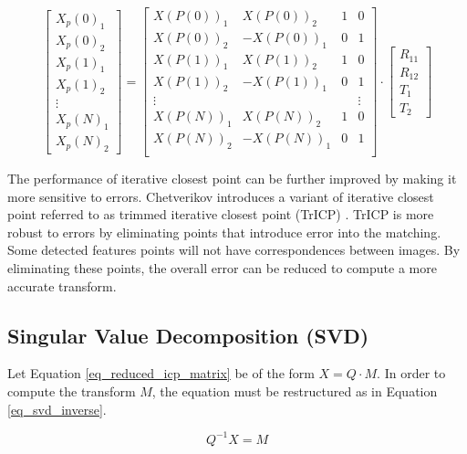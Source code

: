 \documentclass{article}
\begin{document}
\begin{equation}
\begin{bmatrix}
X_p(0)_1 \\
X_p(0)_2 \\
X_p(1)_1 \\
X_p(1)_2 \\
\vdots \\
X_p(N)_1 \\
X_p(N)_2
\end{bmatrix}
=
\begin{bmatrix}
X(P(0))_1 & X(P(0))_2 & 1 & 0 \\
X(P(0))_2 & -X(P(0))_1 & 0 & 1 \\
X(P(1))_1 & X(P(1))_2 & 1 & 0 \\
X(P(1))_2 & -X(P(1))_1 & 0 & 1 \\
\vdots & & & \vdots \\
X(P(N))_1 & X(P(N))_2 & 1 & 0 \\
X(P(N))_2 & -X(P(N))_1 & 0 & 1 \\
\end{bmatrix}
\cdot
\begin{bmatrix}
R_{11} \\
R_{12} \\
T_1 \\
T_2
\end{bmatrix}
\label{eq_reduced_icp_matrix}
\end{equation}

The performance of iterative closest point can be further improved by making it more sensitive to errors. Chetverikov introduces a variant of iterative closest point referred to as trimmed iterative closest point (TrICP) \cite{chetverikov_trimmed_2002}. TrICP is more robust to errors by eliminating points that introduce error into the matching. Some detected features points will not have correspondences between images. By eliminating these points, the overall error can be reduced to compute a more accurate transform.

\subsection{Singular Value Decomposition (SVD)}

Let Equation \ref{eq_reduced_icp_matrix} be of the form $X=Q \cdot M$. In order to compute the transform $M$, the equation must be restructured as in Equation \ref{eq_svd_inverse}.

\begin{equation}
Q^{-1} X = M
\label{eq_svd_inverse}
\end{equation}
\end{document}

